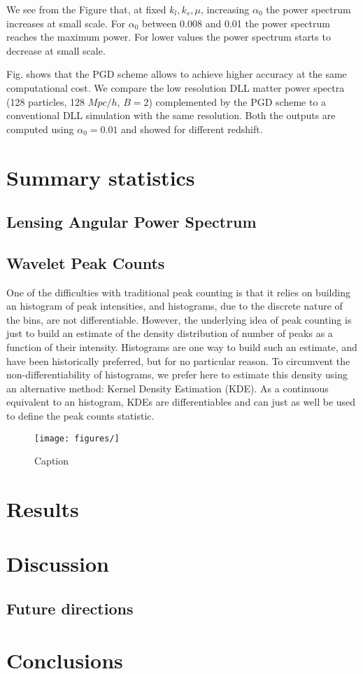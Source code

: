\documentclass[twocolumn,twocolappendix]{aastex63}
\begin{document}
We see from the Figure that, at fixed $k_l,k_s,\mu$, increasing $\alpha_0$ the power spectrum increases at small scale. For $\alpha_0$ between 0.008 and 0.01 the power spectrum reaches the maximum power. For lower values the power spectrum starts to decrease at small scale. 

Fig. shows that the PGD scheme allows to achieve higher accuracy at the same computational cost. We compare the low resolution DLL matter power spectra (128 particles, 128 $Mpc/h$, $B=2$) complemented by the PGD scheme to a conventional DLL simulation with the same resolution. Both the outputs are computed using $\alpha_0=0.01$ and showed for different redshift. 




\section{Summary statistics}

\subsection{Lensing Angular Power Spectrum}


\subsection{Wavelet Peak Counts}


One of the difficulties with traditional peak counting is that it relies on building
an histogram of peak intensities, and histograms, due to the discrete nature of the bins, are not differentiable. However, the underlying idea of peak counting is just to build an estimate of the density distribution of number of peaks as a function of their intensity. Histograms are one way to build such an estimate, and have been historically preferred, but for no particular reason. To circumvent the non-differentiability of histograms, we prefer here to estimate this density using an alternative method: Kernel Density Estimation (KDE). As a continuous equivalent to an histogram, KDEs are differentiables and can just as well be used to define the peak counts statistic.



\begin{figure}
    \centering
    \texttt{[image: figures/]}
    \caption{Caption}
    \label{fig:my_label}
\end{figure}


\section{Results}

\section{Discussion}

\subsection{Future directions}

\section{Conclusions}

\end{document}
